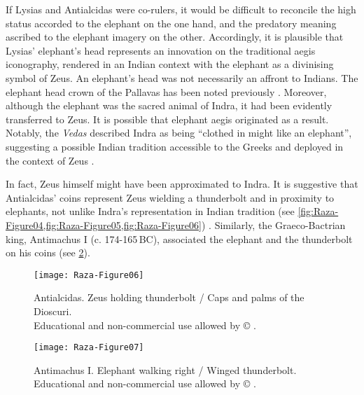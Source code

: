 \documentclass{ijsra}
\renewcommand\BC{{\,BC\xspace}}
\def\coinindia{Educational and non-commercial use allowed by © \cite{Coin}.}
\begin{document}
If Lysias and Antialcidas were co-rulers, it would be difficult to reconcile the high status accorded to the elephant on the one hand, and the predatory meaning ascribed to the elephant imagery on the other.
Accordingly, it is plausible that Lysias’ elephant’s head represents an innovation on the traditional aegis iconography, rendered in an Indian context with the elephant as a divinising symbol of Zeus.
An elephant’s head was not necessarily an affront to Indians. The elephant head crown of the Pallavas has been noted previously \parencite[66--70]{Hudson2008}. 
Moreover, although the elephant was the sacred animal of Indra, it had been evidently transferred to Zeus.
It is possible that elephant aegis originated as a result.
Notably, the \emph{Vedas} described Indra as being “clothed in might like an elephant”, suggesting a possible Indian tradition accessible to the Greeks and deployed in the context of Zeus \parencite[22]{Gupta1983}. 

In fact, Zeus himself might have been approximated to Indra.
It is suggestive that Antialcidas’ coins represent Zeus wielding a thunderbolt and in proximity to elephants, not unlike Indra’s representation in Indian tradition (see \cref{fig:Raza-Figure04,fig:Raza-Figure05,fig:Raza-Figure06}) \parencite[242--247]{MacDowall2007b}.
Similarly, the Graeco-Bactrian king, Antimachus I (c. 174-165\BC), associated the elephant and the thunderbolt on his coins (see \cref{fig:Raza-Figure07}). 

\begin{figure}[!htb] %
	\centering
	\texttt{[image: Raza-Figure06]}
	\caption{Antialcidas. Zeus holding thunderbolt / Caps and palms of the Dioscuri.
		{\normalfont\scriptsize \\ \coinindia}}
	\label{fig:Raza-Figure06}
\end{figure}

\begin{figure}[!htb] %
	\centering
	\texttt{[image: Raza-Figure07]}
	\caption{Antimachus I. Elephant walking right / Winged thunderbolt.
		{\normalfont\scriptsize \\ \coinindia}}
	\label{fig:Raza-Figure07}
\end{figure}
\end{document}
